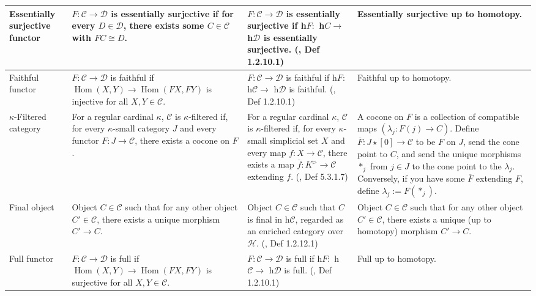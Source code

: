 \documentclass{article}
\DeclareMathOperator{\Hom}{Hom}
\begin{document}
\begin{centre}
\begin{longtable}{ |p{3.2cm}||p{5cm}|p{5.2cm}|p{5cm}|  }
\hline 
Essentially surjective functor & \(F : \mathcal{C} \to \mathcal{D}\) is essentially surjective if for every \(D \in \mathcal{D}\), there exists some \(C \in \mathcal{C}\) with \(FC \cong D\). & \(F : \mathcal{C} \to \mathcal{D}\) is essentially surjective if h\(F :\) h\(C \to\) h\(\mathcal{D}\) is essentially surjective. (\autocite{htt}, Def 1.2.10.1) & Essentially surjective up to homotopy.\\
\hline
Faithful functor & \(F : \mathcal{C} \to \mathcal{D}\) is faithful if \(\Hom(X,Y)\to \Hom(FX, FY)\) is injective for all \(X,Y \in \mathcal{C}\). & \(F : \mathcal{C} \to \mathcal{D}\) is faithful if h\(F :\) h\(\mathcal{C} \to\) h\(\mathcal{D}\) is faithful. (\autocite{htt}, Def 1.2.10.1) & Faithful up to homotopy.\\
\hline
\(\kappa\)-Filtered category & For a regular cardinal \(\kappa\), \(\mathcal{C}\) is \(\kappa\)-filtered if, for every \(\kappa\)-small category \(J\) and every functor \(F : J \to \mathcal{C}\), there exists a cocone on \(F\). & For a regular cardinal \(\kappa\), \(\mathcal{C}\) is \(\kappa\)-filtered if, for every \(\kappa\)-small simplicial set \(X\) and every map \(f : X \to \mathcal{C}\), there exists a map \(\overline f : K^\rhd \to \mathcal{C}\) extending \(f\). (\autocite{htt}, Def 5.3.1.7) & A cocone on \(F\) is a collection of compatible maps \((\lambda_j : F(j) \to C)\). Define \(\overline F : J \star [0] \to \mathcal{C}\) to be \(F\) on \(J\), send the cone point to \(C\), and send the unique morphisms \(*_j\) from \(j \in J\) to the cone point to the \(\lambda_j\). Conversely, if you have some \(\overline F\) extending \(F\), define \(\lambda_j := F(*_j)\).\\
\hline
 Final object & Object \(C\in \mathcal{C} \) such that for any other object \(C' \in \mathcal{C}\), there exists a unique morphism \(C' \to C\). & Object \(C \in \mathcal{C}\) such that \(C\) is final in h\(\mathcal{C}\), regarded as an enriched category over \(\mathcal{H}\).  (\autocite{htt}, Def 1.2.12.1) & Object \(C\in \mathcal{C}\) such that for any other object \(C' \in \mathcal{C}\), there exists a unique (up to homotopy) morphism \(C' \to C\).\\
\hline
Full functor & \(F : \mathcal{C} \to \mathcal{D}\) is full if \(\Hom(X,Y)\to \Hom(FX, FY)\) is surjective for all \(X,Y \in \mathcal{C}\). & \(F : \mathcal{C} \to \mathcal{D}\) is full if h\(F :\) h\(\mathcal{C} \to\) h\(\mathcal{D}\) is full. (\autocite{htt}, Def 1.2.10.1) & Full up to homotopy.\\
\hline

\end{longtable}
\end{centre}
\end{document}
